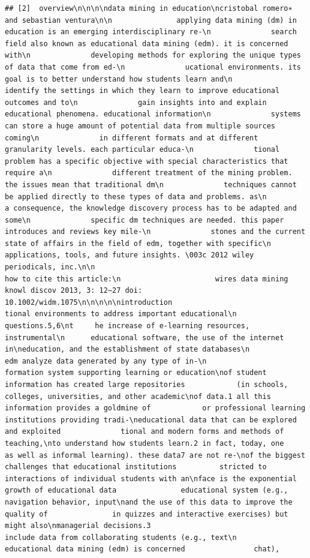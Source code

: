 \documentclass[
]{article}
\begin{document}
\begin{verbatim}
## [2]  overview\n\n\n\ndata mining in education\ncristobal romero∗ and sebastian ventura\n\n               applying data mining (dm) in education is an emerging interdisciplinary re-\n              search field also known as educational data mining (edm). it is concerned with\n              developing methods for exploring the unique types of data that come from ed-\n              ucational environments. its goal is to better understand how students learn and\n              identify the settings in which they learn to improve educational outcomes and to\n              gain insights into and explain educational phenomena. educational information\n              systems can store a huge amount of potential data from multiple sources coming\n              in different formats and at different granularity levels. each particular educa-\n              tional problem has a specific objective with special characteristics that require a\n              different treatment of the mining problem. the issues mean that traditional dm\n              techniques cannot be applied directly to these types of data and problems. as\n              a consequence, the knowledge discovery process has to be adapted and some\n              specific dm techniques are needed. this paper introduces and reviews key mile-\n              stones and the current state of affairs in the field of edm, together with specific\n              applications, tools, and future insights. \003c 2012 wiley periodicals, inc.\n\n                                                  how to cite this article:\n                      wires data mining knowl discov 2013, 3: 12–27 doi: 10.1002/widm.1075\n\n\n\n\nintroduction                                                     tional environments to address important educational\n                                                                 questions.5,6\nt     he increase of e-learning resources, instrumental\n      educational software, the use of the internet in\neducation, and the establishment of state databases\n                                                                        edm analyze data generated by any type of in-\n                                                                 formation system supporting learning or education\nof student information has created large repositories            (in schools, colleges, universities, and other academic\nof data.1 all this information provides a goldmine of            or professional learning institutions providing tradi-\neducational data that can be explored and exploited              tional and modern forms and methods of teaching,\nto understand how students learn.2 in fact, today, one           as well as informal learning). these data7 are not re-\nof the biggest challenges that educational institutions          stricted to interactions of individual students with an\nface is the exponential growth of educational data               educational system (e.g., navigation behavior, input\nand the use of this data to improve the quality of               in quizzes and interactive exercises) but might also\nmanagerial decisions.3                                           include data from collaborating students (e.g., text\n       educational data mining (edm) is concerned                chat), 
\end{verbatim}
\end{document}
